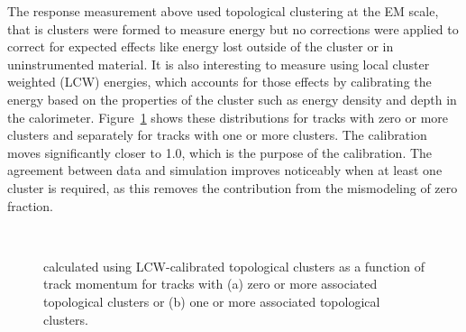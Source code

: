 The response measurement above used topological clustering at the EM scale, that is clusters were formed to measure energy but no corrections were applied to correct for expected effects like energy lost outside of the cluster or in uninstrumented material. 
It is also interesting to measure \epcor using local cluster weighted (LCW) energies, which accounts for those effects by calibrating the energy based on the properties of the cluster such as energy density and depth in the calorimeter.
Figure~\ref{fig:eoverp_corrected_lcw} shows these distributions for tracks with zero or more clusters and separately for tracks with one or more clusters.
The calibration moves \epcor significantly closer to 1.0, which is the purpose of the calibration.
The agreement between data and simulation improves noticeably when at least one cluster is required, as this removes the contribution from the mismodeling of zero fraction. 

\begin{figure}[h]
\centering
{}
~
\caption{\epcor calculated using LCW-calibrated topological clusters as a function of track momentum for tracks with (a) zero or more associated topological clusters or (b) one or more associated topological clusters.}
\label{fig:eoverp_corrected_lcw}
\end{figure}


